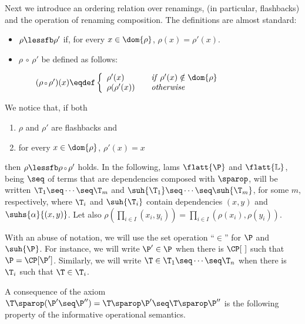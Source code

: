 Next we introduce an ordering relation over renamings, (in particular, flashbacks) 
and the operation of renaming composition. The definitions are almost standard:
\begin{itemize}
\item 
$\rho \lessfb \rho'$ if, for every $x \in \dom{\rho}$, $\rho(x) = \rho'(x)$.
\item
$\rho  {\scriptstyle \, \circ \,} \rho'$ be defined as follows: 

\smallskip

$\qquad(\rho {\scriptstyle \, \circ \,} \rho')(x) \eqdef 
\left\{ \begin{array}{l@{\qquad}l}
		\rho'(x) & {\it if} \;  \rho'(x) \notin \dom{\rho}
		\\ 
		\rho(\rho'(x)) & {\it otherwise} 
		\end{array} \right.$
\end{itemize}
We notice that, if both
\begin{enumerate}
\item
 $\rho$ and $\rho'$ are flashbacks and 
\item
for every $x \in \dom{\rho}$,  
$\rho'(x) = x$
\end{enumerate}
then $\rho \lessfb \rho {\scriptstyle \, \circ \,} \rho'$ holds.
In the following, lams $\flatt{\P}$ and $\flatt{\mathbb{L}}$, being $\seq$ of
terms that are dependencies composed with $\sparop$, will be written 
$\T_1 \seq \cdots \seq \T_m$ and
$\suh{\T_1} \seq \cdots \seq \suh{\T_m}$, for some $m$, 
respectively, where $\T_i$ and $\suh{\T_i}$ contain dependencies $(x,y)$ and 
$\suhs{\alpha}{(x,y)}$. Let also $\rho(\prod_{i \in I} (x_i,y_i)) = 
\prod_{i \in I}(\rho(x_i), \rho(y_i))$.

With an abuse of notation, we will use the set operation ``$\in$''
for $\P$ and $\suh{\P}$. For instance, we will write $\P' \in \P$  when there is
$\CP[~]$ such that $\P = 
\CP[\P']$. Similarly, we will write $\T \in \T_1 \seq \cdots \seq \T_n$ when there
is $\T_i$ such that $\T \in \T_i$.

A consequence of the
axiom $\T \sparop (\P' \seq \P'')  = \T\sparop \P' \seq \T \sparop \P''$ is 
the following property of the informative operational semantics.

